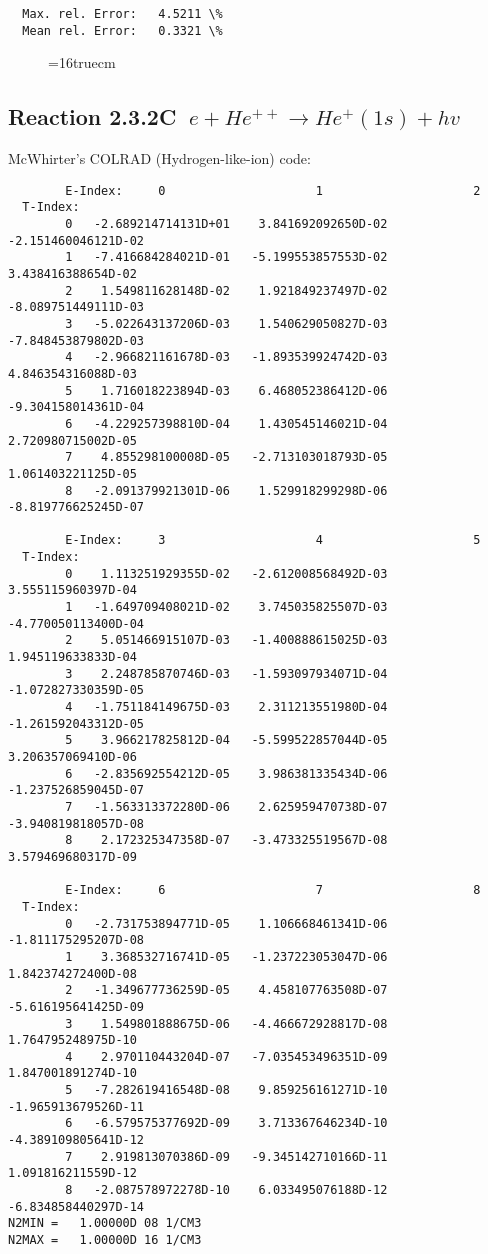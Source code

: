 \documentclass[12pt,dvipdfmx]{article}
\begin{document}
{\begin{small}
\begin{verbatim}
  Max. rel. Error:   4.5211 \%
  Mean rel. Error:   0.3321 \%

\end{verbatim}\end{small}
\begin{figure} \label{2.3.2B1}
\epsfxsize=16truecm
\end{figure}
\newpage


\subsection{
Reaction 2.3.2C   $\  e + He^{++} \rightarrow  He^+(1s) + hv$
}
McWhirter's COLRAD (Hydrogen-like-ion) code: \cite{kn:McWhirter}
\begin{small}\begin{verbatim}
        E-Index:     0                     1                     2
  T-Index:
        0   -2.689214714131D+01    3.841692092650D-02   -2.151460046121D-02
        1   -7.416684284021D-01   -5.199553857553D-02    3.438416388654D-02
        2    1.549811628148D-02    1.921849237497D-02   -8.089751449111D-03
        3   -5.022643137206D-03    1.540629050827D-03   -7.848453879802D-03
        4   -2.966821161678D-03   -1.893539924742D-03    4.846354316088D-03
        5    1.716018223894D-03    6.468052386412D-06   -9.304158014361D-04
        6   -4.229257398810D-04    1.430545146021D-04    2.720980715002D-05
        7    4.855298100008D-05   -2.713103018793D-05    1.061403221125D-05
        8   -2.091379921301D-06    1.529918299298D-06   -8.819776625245D-07

        E-Index:     3                     4                     5
  T-Index:
        0    1.113251929355D-02   -2.612008568492D-03    3.555115960397D-04
        1   -1.649709408021D-02    3.745035825507D-03   -4.770050113400D-04
        2    5.051466915107D-03   -1.400888615025D-03    1.945119633833D-04
        3    2.248785870746D-03   -1.593097934071D-04   -1.072827330359D-05
        4   -1.751184149675D-03    2.311213551980D-04   -1.261592043312D-05
        5    3.966217825812D-04   -5.599522857044D-05    3.206357069410D-06
        6   -2.835692554212D-05    3.986381335434D-06   -1.237526859045D-07
        7   -1.563313372280D-06    2.625959470738D-07   -3.940819818057D-08
        8    2.172325347358D-07   -3.473325519567D-08    3.579469680317D-09

        E-Index:     6                     7                     8
  T-Index:
        0   -2.731753894771D-05    1.106668461341D-06   -1.811175295207D-08
        1    3.368532716741D-05   -1.237223053047D-06    1.842374272400D-08
        2   -1.349677736259D-05    4.458107763508D-07   -5.616195641425D-09
        3    1.549801888675D-06   -4.466672928817D-08    1.764795248975D-10
        4    2.970110443204D-07   -7.035453496351D-09    1.847001891274D-10
        5   -7.282619416548D-08    9.859256161271D-10   -1.965913679526D-11
        6   -6.579575377692D-09    3.713367646234D-10   -4.389109805641D-12
        7    2.919813070386D-09   -9.345142710166D-11    1.091816211559D-12
        8   -2.087578972278D-10    6.033495076188D-12   -6.834858440297D-14
N2MIN =   1.00000D 08 1/CM3
N2MAX =   1.00000D 16 1/CM3


\end{verbatim}
\end{small}}
\end{document}
